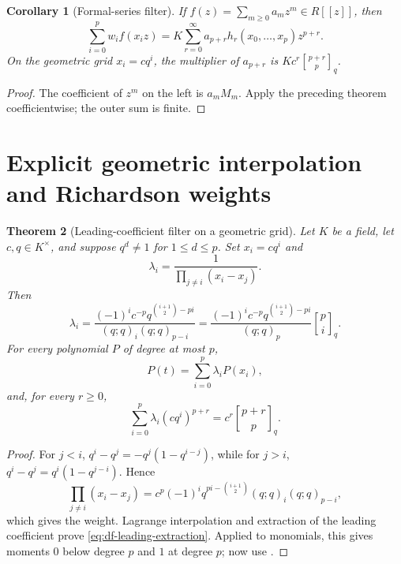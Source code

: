 \documentclass[11pt,oneside,openany]{book}
\newtheorem{theorem}{Theorem}[chapter]
\newtheorem{corollary}[theorem]{Corollary}
\theoremstyle{definition}
\theoremstyle{remark}
\newcommand{\Qbinom}[3]{\genfrac{[}{]}{0pt}{}{#1}{#2}_{#3}}
\begin{document}
\begin{corollary}[Formal-series filter]
\label{cor:df-formal-series-filter}
If $f(z)=\sum_{m\ge0}a_mz^m\in R[[z]]$, then
\begin{equation}
 \sum_{i=0}^{p}w_if(x_i z)
 =K\sum_{r=0}^{\infty}a_{p+r}
 h_r(x_0,\ldots,x_p)z^{p+r}.
 \label{eq:df-formal-series-filter}
\end{equation}
On the geometric grid $x_i=cq^i$, the multiplier of $a_{p+r}$ is
$Kc^r\Qbinom{p+r}{p}q$.
\end{corollary}

\begin{proof}
The coefficient of $z^m$ on the left is $a_mM_m$.  Apply the preceding
theorem coefficientwise; the outer sum is finite.
\end{proof}

\section{Explicit geometric interpolation and Richardson weights}

\begin{theorem}[Leading-coefficient filter on a geometric grid]
\label{thm:df-geometric-leading-filter}
Let $K$ be a field, let $c,q\in K^\times$, and suppose $q^d\ne1$ for
$1\le d\le p$.  Set $x_i=cq^i$ and
\[
 \lambda_i=\frac1{\prod_{j\ne i}(x_i-x_j)}.
\]
Then
\begin{equation}
 \lambda_i=
 \frac{(-1)^i c^{-p}q^{\binom{i+1}{2}-pi}}
 {(q;q)_i(q;q)_{p-i}}
 =\frac{(-1)^i c^{-p}q^{\binom{i+1}{2}-pi}}
 {(q;q)_p}\Qbinom piq.
 \label{eq:df-leading-weight}
\end{equation}
For every polynomial $P$ of degree at most $p$,
\begin{equation}
 [t^p]P(t)=\sum_{i=0}^{p}\lambda_iP(x_i),
 \label{eq:df-leading-extraction}
\end{equation}
and, for every $r\ge0$,
\begin{equation}
 \sum_{i=0}^{p}\lambda_i(cq^i)^{p+r}
 =c^r\Qbinom{p+r}{p}q.
 \label{eq:df-leading-all-degrees}
\end{equation}
\end{theorem}

\begin{proof}
For $j<i$, $q^i-q^j=-q^j(1-q^{i-j})$, while for $j>i$,
$q^i-q^j=q^i(1-q^{j-i})$.  Hence
\[
 \prod_{j\ne i}(x_i-x_j)
 =c^p(-1)^iq^{pi-\binom{i+1}{2}}(q;q)_i(q;q)_{p-i},
\]
which gives the weight.  Lagrange interpolation and extraction of the leading
coefficient prove \eqref{eq:df-leading-extraction}.  Applied to monomials,
this gives moments $0$ below degree $p$ and $1$ at degree $p$; now use
.
\end{proof}
\end{document}
